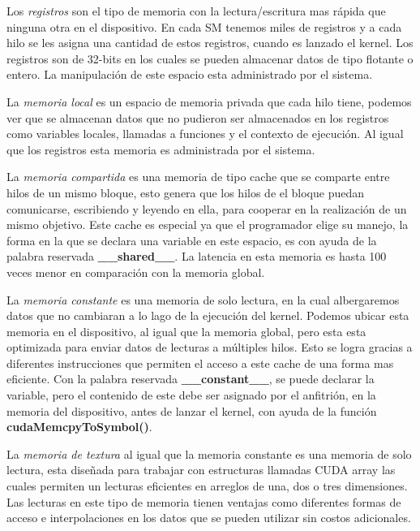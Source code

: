 Los \textit{registros} son el tipo de memoria con la lectura/escritura mas rápida que ninguna otra en el dispositivo. En cada SM tenemos miles de registros y a cada hilo se les asigna una cantidad de estos registros, cuando es lanzado el kernel. Los registros son de 32-bits en los cuales se pueden almacenar datos de tipo flotante o entero. La manipulación de este espacio esta administrado por el sistema.

La \textit{memoria local} es un espacio de memoria privada que cada hilo tiene, podemos ver que se almacenan datos que no pudieron ser almacenados en los registros como variables locales, llamadas a funciones y el contexto de ejecución. Al igual que los registros esta memoria es administrada por el sistema.

La \textit{memoria compartida} es una memoria de tipo cache que se comparte entre hilos de un mismo bloque, esto genera que los hilos de el bloque puedan comunicarse, escribiendo y leyendo en ella, para cooperar en la realización de un mismo objetivo. Este cache es especial ya que el programador elige su manejo, la forma en la que se declara una variable en este espacio, es con ayuda de la palabra reservada \textbf{\_\_shared\_\_}. La latencia en esta memoria es hasta 100 veces menor en comparación con la memoria global. 

La\textit{ memoria constante} es una memoria de solo lectura, en la cual albergaremos datos que no cambiaran a lo lago de la ejecución del kernel. Podemos ubicar esta memoria en el dispositivo, al igual que la memoria global, pero esta esta optimizada para enviar datos de lecturas a múltiples hilos. Esto se logra gracias a diferentes instrucciones  que permiten el acceso a este cache de una forma mas eficiente. Con la palabra reservada \textbf{\_\_constant\_\_}, se puede declarar la variable, pero el contenido de este debe ser asignado por el anfitrión, en la memoria del dispositivo, antes de lanzar el kernel, con ayuda de la función \textbf{cudaMemcpyToSymbol()}.

La \textit{memoria de textura} al igual que la memoria constante es una memoria de solo lectura, esta diseñada para trabajar con estructuras llamadas CUDA array las cuales permiten un lecturas eficientes en arreglos de una, dos o tres dimensiones. Las lecturas en este tipo de memoria tienen ventajas como diferentes formas de acceso e interpolaciones en los datos que se pueden utilizar sin costos adicionales.

